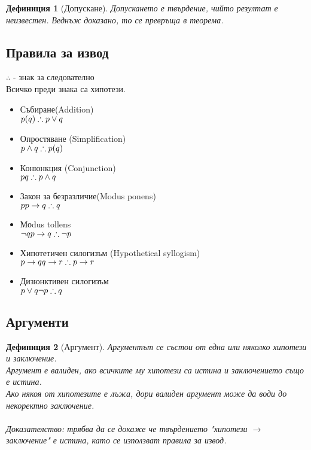 \documentclass[fleqn, 12pt]{article}
\newtheorem{definition}{Дефиниция}[subsection]
\theoremstyle{definition}
\begin{document}
\begin{definition}[Допускане]
Допускането е твърдение, чийто резултат е неизвестен. Веднъж доказано, то се превръща в теорема. 
\end{definition}

\subsection{Правила за извод}
$\therefore$ - знак за следователно\\
Всичко преди знака са хипотези. 
\begin{itemize}
	\item Събиране(Addition) \\ $p (q) \\ \therefore p\lor q$
	\item Опростяване (Simplification) \\$p\land q \\ \therefore p(q)$
	\item Конюнкция (Conjunction) \\$p \\ q\\ \therefore p\land q$
	\item Закон за безразличие(Modus ponens) \\ $p \\ p \to q \\ \therefore q$
	\item Моdus tollens \\$\neg q \\ p \to q \\ \therefore \neg p$
	\item Хипотетичен силогизъм (Hypothetical syllogism) \\$ p \to q \\ q \to r \\ \therefore p \to r $
	\item Дизюнктивен силогизъм \\ $p\lor q \\ \neg p \\ \therefore q$
\end{itemize}

\subsection{Аргументи}

\begin{definition}[Аргумент]
Аргументът се състои от една или няколко хипотези и заключение. \\
Аргумент е валиден, ако всичките му хипотези са истина и заключението също е истина. \\
Ако някоя от хипотезите е лъжа, дори валиден аргумент може да води до некоректно заключение. \\
\\
Доказателство: трябва да се докаже че твърдението "хипотези $\to$ заключение" е истина, като се използват правила за извод. 
\end{definition}
\end{document}
